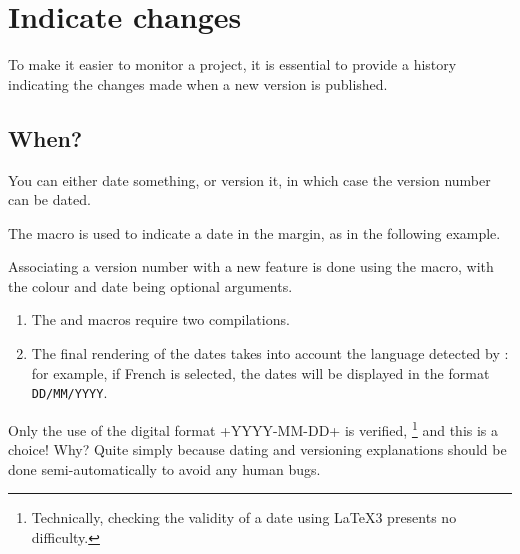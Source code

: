 \documentclass[10pt, a4paper]{tutodoc}
\begin{document}
\section{Indicate changes}

To make it easier to monitor a project, it is essential to provide a history indicating the changes made when a new version is published.



\subsection{When?}

You can either date something, or version it, in which case the version number can be dated.




\begin{tdocexa}
    The  macro is used to indicate a date in the margin, as in the following example.

\end{tdocexa}




\begin{tdocexa}
    Associating a version number with a new feature is done using the  macro, with the colour and date being optional arguments.

\end{tdocexa}


\begin{tdocimp}
    \begin{enumerate}[wide]
        \item The  and  macros require two compilations.

        \item The final rendering of the dates takes into account the language detected by \thisproj{}: for example, if French is selected, the dates will be displayed in the format \texttt{DD/MM/YYYY}.
    \end{enumerate}
\end{tdocimp}


\begin{tdocwarn}
    Only the use of the digital format \tdocinlatex+YYYY-MM-DD+ is verified,
    \footnote{
        Technically, checking the validity of a date using \LaTeX3 presents no difficulty.
    }
    and this is a choice! Why? Quite simply because dating and versioning explanations should be done semi-automatically to avoid any human bugs.
\end{tdocwarn}
\end{document}
